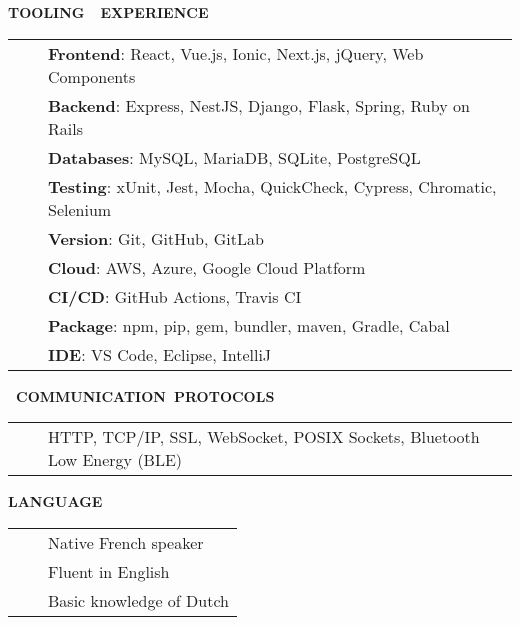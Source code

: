 \documentclass[a4paper,11pt,english]{article}
\newcommand{\LeftColumn}[0]{6.0cm}
\newcommand{\ToolCategory}[1]{\textbf{#1}}
\newcommand{\Bullet}[0]{\faCaretRight~~}
\newcommand{\Rubric}[1]{\colorbox{gray!20}{\parbox{\linewidth}{\centering\sffamily\bfseries{}#1}}}
\begin{document}
\begin{minipage}[t]{\LeftColumn}

\Rubric{\faTools \quad TOOLING~~EXPERIENCE}\vspace{8pt}

\begin{tabularx}{\linewidth}{@{}l@{}>{\raggedright\arraybackslash}X@{}}
\Bullet & \ToolCategory{Frontend}: React, Vue.js, Ionic, Next.js, jQuery, Web Components \\[0pt]
\Bullet & \ToolCategory{Backend}: Express, NestJS, Django, Flask, Spring, Ruby on Rails \\[0pt]
\Bullet & \ToolCategory{Databases}: MySQL, MariaDB, SQLite, PostgreSQL \\[0pt]
\Bullet & \ToolCategory{Testing}: xUnit, Jest, Mocha, QuickCheck, Cypress, Chromatic, Selenium \\[0pt]
\Bullet & \ToolCategory{Version}: Git, GitHub, GitLab \\[0pt]
\Bullet & \ToolCategory{Cloud}: AWS, Azure, Google Cloud Platform \\[0pt]
\Bullet & \ToolCategory{CI/CD}:  GitHub Actions, Travis CI \\[0pt]
\Bullet & \ToolCategory{Package}: npm, pip, gem, bundler, maven, Gradle, Cabal \\[0pt]
\Bullet & \ToolCategory{IDE}: VS Code, Eclipse, IntelliJ \\[0pt]
\end{tabularx}

\vspace{12pt}\Rubric{\faNetworkWired~COMMUNICATION~PROTOCOLS}\vspace{8pt}

\begin{tabularx}{\linewidth}{@{}l@{}>{\raggedright\arraybackslash}X@{}}
\Bullet & HTTP, TCP/IP, SSL, WebSocket, POSIX Sockets, Bluetooth Low Energy (BLE) \\[0pt]
\end{tabularx}

\vspace{12pt}\Rubric{\faLanguage \quad LANGUAGE}\vspace{8pt}

\begin{tabularx}{\linewidth}{@{}l@{}l@{}}
\Bullet & Native French speaker \\[0pt]
\Bullet & Fluent in English \\[0pt]
\Bullet & Basic knowledge of Dutch \\[0pt]
\end{tabularx}


\end{minipage}
\end{document}
